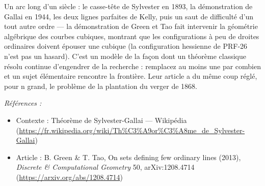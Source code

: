 \documentclass[11pt]{article}
\newenvironment{refs}{\par\small\noindent\emph{Références :}\begin{itemize}\setlength\itemsep{0pt}}{\end{itemize}\normalsize}
\begin{document}
\noindent Un arc long d'un siècle : le casse-tête de Sylvester en 1893, la
démonstration de Gallai en 1944, les deux lignes parfaites de Kelly, puis un saut de
difficulté d'un tout autre ordre --- la démonstration de Green et Tao fait intervenir la
géométrie algébrique des courbes cubiques, montrant que les configurations à peu de droites
ordinaires doivent épouser une cubique (la configuration hessienne de PRF-26 n'est pas un
hasard). C'est un modèle de la façon dont un théorème classique résolu continue d'engendrer
de la recherche : remplacez \og{} au moins une \fg{} par \og{} combien \fg{} et un sujet élémentaire rencontre
la frontière. Leur article a du même coup réglé, pour n grand, le problème de la plantation
du verger de 1868.

\begin{refs}
\item Contexte : Théorème de Sylvester-Gallai --- Wikipédia (\url{https://fr.wikipedia.org/wiki/Th%C3%A9or%C3%A8me_de_Sylvester-Gallai})
\item Article : B. Green \& T. Tao, \og{} On sets defining few ordinary lines \fg{} (2013), \textit{Discrete \& Computational Geometry} 50, arXiv:1208.4714 (\url{https://arxiv.org/abs/1208.4714})
\end{refs}

\bigskip
\end{document}
